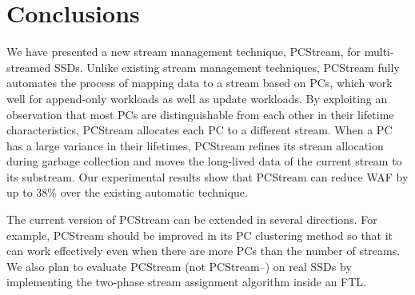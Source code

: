 \section{Conclusions}
We have presented a new stream management technique, {\sf PCStream}, for multi-streamed SSDs.  
Unlike existing stream management techniques, {\sf PCStream} fully automates 
the process of mapping data to a stream based on PCs, 
which work well for append-only workloads as well as update workloads.  
By exploiting an observation that most PCs are distinguishable from each other 
in their lifetime characteristics, {\sf PCStream} allocates each PC to a different stream.  
When a PC has a large variance in their lifetimes, {\sf PCStream} refines its stream allocation 
during garbage collection and moves the long-lived data of the current stream to its substream.  
Our experimental results show that {\sf PCStream} can reduce WAF by up to 38\% over the existing
automatic technique.

The current version of {\sf PCStream} can be extended in several directions.  
For example, {\sf PCStream} should be improved in its PC clustering method 
so that it can work effectively even when there are more PCs than the number of streams.  
We also plan to evaluate {\sf PCStream} (not {\sf PCStream--}) on real SSDs 
by implementing the two-phase stream assignment algorithm inside an FTL.

